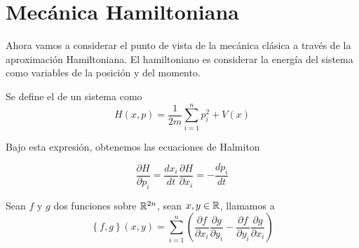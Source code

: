 \chapter{Mecánica Hamiltoniana}

Ahora vamos a considerar el punto de vista de la mecánica clásica a través de la aproximación Hamiltoniana.
El hamiltoniano es considerar la energía del sistema como variables de la posición y del momento.

\begin{definition}[Hamiltoniano]
    Se define el  de un sistema como 
    \begin{equation}
        \label{hamiltoniano}
        H(x,p)=\frac{1}{2m}\sum_{i=1}^{n} p_i^2 +V(x)
    \end{equation}

\end{definition}

Bajo esta expresión, obtenemos las ecuaciones de Halmiton
\begin{postulate}
    \begin{subequations}
        \begin{equation}\label{eq:halmiton_parcial_momento}
            \frac{\partial H}{\partial p_i}=\frac{d x_i}{dt}
        \end{equation}
        \begin{equation}\label{eq:halmiton_parcial_posicion}
            \frac{\partial H}{\partial x_i}=-\frac{d p_i}{dt}
        \end{equation}
    \end{subequations}
\end{postulate}

\begin{definition}
    Sean $f$ y $g$ dos funciones sobre $\mathbb{R}^{2n}$, sean $x,y\in\mathbb{R}$, llamamos  a
    \begin{equation}
        \label{def:corchete_poisson}
        \left\{f,g \right\}(x,y) =\sum_{i=1}^{n}(\frac{\partial f}{\partial x_i}\frac{\partial g}{\partial y_i}-\frac{\partial f}{\partial y_i}\frac{\partial g}{\partial x_i})
    \end{equation}
\end{definition}
